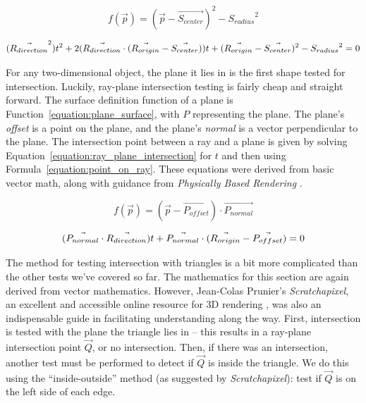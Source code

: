 \begin{equation}
  \label{equation:sphere_surface}
  f(\vec{p}) = (\vec{p} - \vec{S_{center}})^2 - {S_{radius}}^2
\end{equation}

\begin{equation}
  \label{equation:ray_sphere_intersection}
  (\vec{R_{direction}}^2)t^2 + 2(\vec{R_{direction}} \cdot (\vec{R_{origin}} - \vec{S_{center}}))t + (\vec{R_{origin}} - \vec{S_{center}})^2 - {S_{radius}}^2 = 0
\end{equation}


For any two-dimensional object, the plane it lies in is the first shape tested for intersection.
Luckily, ray-plane intersection testing is fairly cheap and straight forward.
The surface definition function of a plane is Function~\ref{equation:plane_surface}, with $P$ representing the plane.
The plane's {\it offset} is a point on the plane, and the plane's {\it normal} is a vector perpendicular to the plane.
The intersection point between a ray and a plane is given by solving Equation~\ref{equation:ray_plane_intersection} for $t$ and then using Formula~\ref{equation:point_on_ray}.
These equations were derived from basic vector math, along with guidance from {\it Physically Based Rendering} \cite{pharr2016physically}.

\begin{equation}
  \label{equation:plane_surface}
  f(\vec{p}) = (\vec{p} - \vec{P_{offset}}) \cdot \vec{P_{normal}}
\end{equation}

\begin{equation}
  \label{equation:ray_plane_intersection}
  (\vec{P_{normal}} \cdot \vec{R_{direction}})t + \vec{P_{normal}} \cdot (\vec{R_{origin}} - \vec{P_{offset}}) = 0
\end{equation}


The method for testing intersection with triangles is a bit more complicated than the other tests we've covered so far.
The mathematics for this section are again derived from vector mathematics.
However, Jean-Colas Prunier's {\it Scratchapixel}, an excellent and accessible online resource for 3D rendering \cite{prunier2017triangle}, was also an indispensable guide in facilitating understanding along the way.
First, intersection is tested with the plane the triangle lies in -- this results in a ray-plane intersection point $\vec{Q}$, or no intersection.
Then, if there was an intersection, another test must be performed to detect if $\vec{Q}$ is inside the triangle.
We do this using the ``inside-outside'' method (as suggested by {\it Scratchapixel}): test if $\vec{Q}$ is on the left side of each edge.

